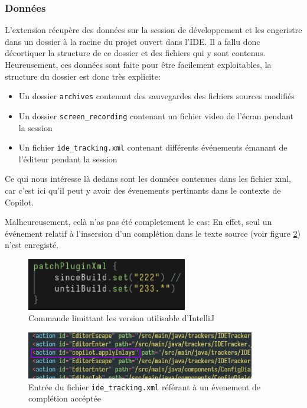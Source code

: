 \subsubsection{Données}

L'extension récupère des données sur la session de développement et les engeristre dans un dossier à la racine du projet ouvert dans l'IDE.
Il a fallu donc décortiquer la structure de ce dossier et des fichiers qui y sont contenus. Heureusement, ces données sont faite pour être facilement exploitables, la structure du dossier est donc très explicite:

\begin{itemize}
  \item Un dossier \lstinline{archives} contenant des sauvegardes des fichiers sources modifiés
  \item Un dossier \lstinline{screen_recording} contenant un fichier video de l'écran pendant la session
  \item Un fichier \lstinline{ide_tracking.xml} contenant différents événements émanant de l'éditeur pendant la session
\end{itemize}

Ce qui nous intéresse là dedans sont les données contenues dans les fichier xml, car c'est ici qu'il peut y avoir des évenements pertinants dans le contexte de Copilot.

Malheureusement, celà n'as pas été completement le cas: En effet, seul un événement relatif à l'insersion d'un complétion dans le texte source
(voir figure \ref{apply-inlay-action}) n'est enregisté.

\begin{figure}
  \centering
  \includegraphics[width=7cm]{images/codegrits-wrong-version.png}
  \caption{Commande limittant les version utilisable d'IntelliJ}
  \label{codegrits-old-build-version}
\end{figure}

\begin{figure}
  \centering
  \includegraphics[width=10cm]{images/apply-inlay-action.png}
  \caption{Entrée du fichier \lstinline{ide_tracking.xml} référant à un évenement de complétion accéptée}
  \label{apply-inlay-action}
\end{figure}


